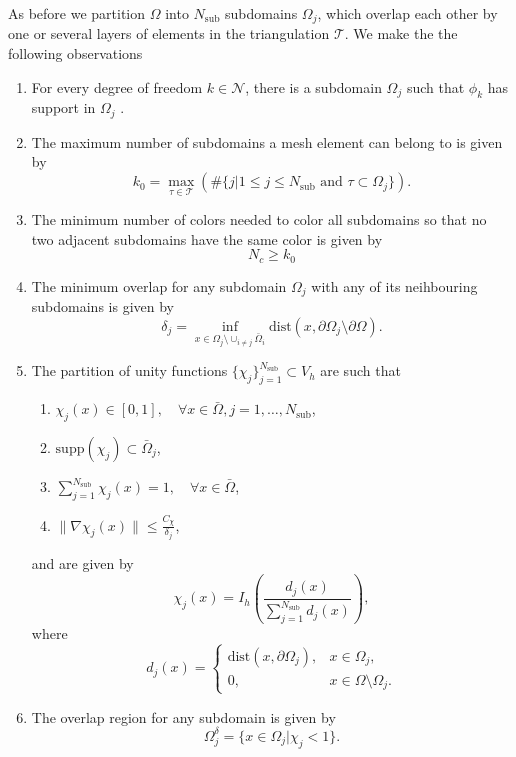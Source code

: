 As before we partition $\Omega$ into $N_{\text{sub}}$ subdomains $\Omega_j$, which overlap each other by one or several layers of elements in the triangulation $\mathcal{T}$. We make the the following observations
\begin{enumerate}[label=\Roman*, ref=ASM observation \Roman*]
    \item\label{ASM_observation:basis_inclusion} For every degree of freedom $k\in\mathcal{N}$, there is a subdomain $\Omega_j$ such that $\phi_k$ has support in $\Omega_j$ \cite[Lemma 5.3]{schwarz_methods_Dolean_2015}.
    \item\label{ASM_observation:multiplicity_of_intersections} The maximum number of subdomains a mesh element can belong to is given by
    \[
        k_0 = \max_{\tau\in\mathcal{T}} \left (\#\{j|1\leq j\leq N_{\text{sub}} \text{ and } \tau \subset \Omega_j\} \right).
    \]
    \item\label{ASM_observation:number_of_colors} The minimum number of colors needed to color all subdomains so that no two adjacent subdomains have the same color is given by
    \[
        N_c \geq k_0
    \]
    \item\label{ASM_observation:overlapping_parameter} The minimum overlap for any subdomain $\Omega_j$ with any of its neihbouring subdomains is given by
    \[
        \delta_j = \inf_{x\in\Omega_j\setminus\cup_{i\neq j} \bar{\Omega}_i} \text{dist}(x, \partial \Omega_j\setminus\partial \Omega).
    \]
    \item\label{ASM_observation:partition_of_unity} The partition of unity functions $\{\chi_j\}_{j=1}^{N_{\text{sub}}}\subset V_h$ are such that
    \begin{enumerate}[label*=.\alph*]
        \item $\chi_j(x) \in [0,1], \quad \forall x\in\bar{\Omega}, j=1,\ldots,N_{\text{sub}}$,
        \item $\text{supp}(\chi_j) \subset \bar{\Omega}_j$,
        \item $\sum_{j=1}^{N_{\text{sub}}} \chi_j(x) = 1, \quad \forall x\in\bar{\Omega}$,
        \item $\|\nabla\chi_j(x)\| \leq \frac{C_{\chi}}{\delta_j}$,
    \end{enumerate}
    and are given by
    \[
        \chi_j(x) = I_h\left(\frac{d_j(x)}{\sum_{j=1}^{N_{\text{sub}}} d_j(x)}\right),
    \]
    where
    \[ 
        d_j(x) = 
            \begin{cases}
                \text{dist}(x, \partial \Omega_j), & x\in\Omega_j, \\
                0, & x\in\Omega\setminus\Omega_j.
            \end{cases}
    \]
    \item\label{ASM_observation:overlap_region} The overlap region for any subdomain is given by 
    \[
        \Omega_j^{\delta} = \{x\in\Omega_j| \chi_j < 1\}.
    \]
\end{enumerate}

